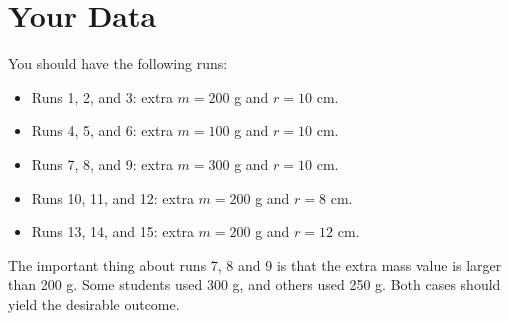 \section{Your Data}
%
You should have the following runs:
\begin{itemize}
    \item Runs 1, 2, and 3: extra $m = 200$ g and $r = 10$ cm.
    \item Runs 4, 5, and 6: extra $m = 100$ g and $r = 10$ cm.
    \item Runs 7, 8, and 9: extra $m = 300$ g and $r = 10$ cm.
    \item Runs 10, 11, and 12: extra $m = 200$ g and $r = 8$ cm.
    \item Runs 13, 14, and 15: extra $m = 200$ g and $r = 12$ cm.
\end{itemize}
The important thing about runs 7, 8 and 9 is that the extra mass value is larger than 200 g. Some students used 300 g, and others used 250 g. Both cases should yield the desirable outcome.
%
